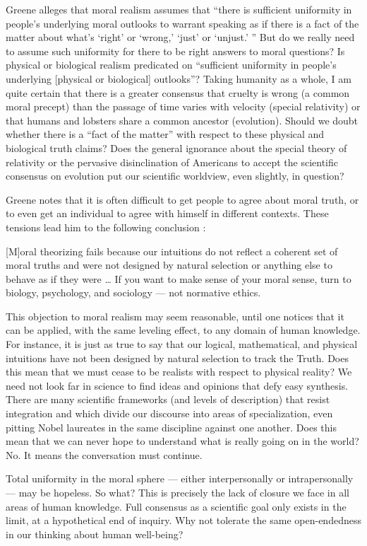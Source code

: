 \documentclass[a4paper,14pt]{extbook}
\begin{document}
Greene alleges that moral realism assumes that ``there is sufficient uniformity in people's underlying moral outlooks to warrant speaking as if there is a fact of the matter about what's `right' or `wrong,' `just' or `unjust.' ''
But do we really need to assume such uniformity for there to be right answers to moral questions?
Is physical or biological realism predicated on ``sufficient uniformity in people's underlying [physical or biological] outlooks''?
Taking humanity as a whole, I am quite certain that there is a greater consensus that cruelty is wrong (a common moral precept) than the passage of time varies with velocity (special relativity) or that humans and lobsters share a common ancestor (evolution).
Should we doubt whether there is a ``fact of the matter'' with respect to these physical and biological truth claims?
Does the general ignorance about the special theory of relativity or the pervasive disinclination of Americans to accept the scientific consensus on evolution put our scientific worldview, even slightly, in question?

Greene notes that it is often difficult to get people to agree about moral truth, or to even get an individual to agree with himself in different contexts.
These tensions lead him to the following conclusion :

[M]oral theorizing fails because our intuitions do not reflect a coherent set of moral truths and were not designed by natural selection or anything else to behave as if they were \dots
If you want to make sense of your moral sense, turn to biology, psychology, and sociology --- not normative ethics.

This objection to moral realism may seem reasonable, until one notices that it can be applied, with the same leveling effect, to any domain of human knowledge.
For instance, it is just as true to say that our logical, mathematical, and physical intuitions have not been designed by natural selection to track the Truth.
Does this mean that we must cease to be realists with respect to physical reality?
We need not look far in science to find ideas and opinions that defy easy synthesis.
There are many scientific frameworks (and levels of description) that resist integration and which divide our discourse into areas of specialization, even pitting Nobel laureates in the same discipline against one another.
Does this mean that we can never hope to understand what is really going on in the world?
No.
It means the conversation must continue.

Total uniformity in the moral sphere --- either interpersonally or intrapersonally --- may be hopeless.
So what?
This is precisely the lack of closure we face in all areas of human knowledge.
Full consensus as a scientific goal only exists in the limit, at a hypothetical end of inquiry.
Why not tolerate the same open-endedness in our thinking about human well-being?
\end{document}
